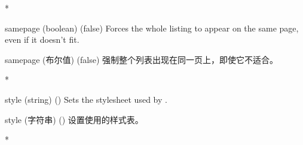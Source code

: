 \begin{optionlist}
\begin{paracol}{2}
\switchcolumn[0]*%
  \item[samepage (boolean) (false)]
    Forces the whole listing to appear on the same page, even if it doesn't fit.
    \switchcolumn
    \item[samepage (布尔值) (false)]
    强制整个列表出现在同一页上，即使它不适合。


\switchcolumn[0]*%
  \item[style] (string) ()
    Sets the stylesheet used by .
    \switchcolumn
    \item[style] (字符串) ()
    设置使用的样式表。


\switchcolumn[0]*%
\end{paracol}
\end{optionlist}



